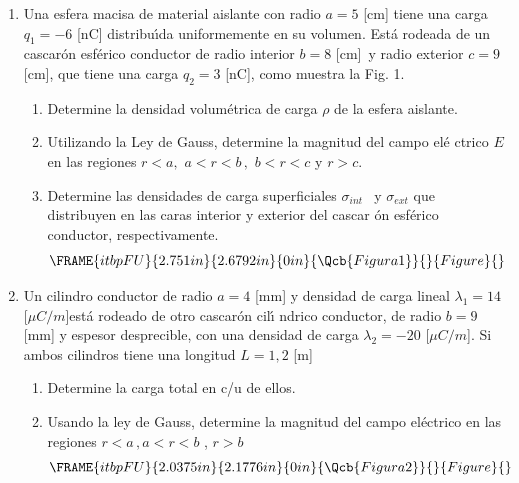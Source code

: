 \documentclass[onecolumn]{article}
\begin{document}
\begin{enumerate}
\item Una esfera macisa de material aislante con radio $a=5$ [cm] tiene una
carga  $q_{1}=-6$ [nC] distribu\'{\i}da uniformemente en su volumen. Est\'{a}
rodeada de un cascar\'{o}n esf\'{e}rico conductor de radio interior $b=8$
[cm]\thinspace\ y radio exterior $c=9$ [cm], que tiene una carga $q_{2}=3$
[nC], como muestra la Fig. 1.

\begin{enumerate}
\item Determine la densidad volum\'{e}trica de carga $\rho $ de la esfera
aislante.

\item Utilizando la Ley de Gauss, determine la magnitud del campo el\'{e}%
ctrico $E$ en las regiones $r<a,$ $a<r<b\,,$ $b<r<c$ y $r>c.$

\item Determine las densidades de carga superficiales $\sigma _{int\text{ }}$%
y $\sigma _{ext}$ que distribuyen en las caras interior y exterior del cascar%
\'{o}n esf\'{e}rico conductor, respectivamente.%
\begin{equation*}
\FRAME{itbpFU}{2.751in}{2.6792in}{0in}{\Qcb{Figura 1}}{}{Figure}{\special%
{language "Scientific Word";type "GRAPHIC";maintain-aspect-ratio
TRUE;display "USEDEF";valid_file "T";width 2.751in;height 2.6792in;depth
0in;original-width 8.3411in;original-height 8.1215in;cropleft "0";croptop
"1";cropright "1";cropbottom "0";tempfilename
'TLCXI900.bmp';tempfile-properties "XPR";}}
\end{equation*}%
\pagebreak 
\end{enumerate}

\item Un cilindro conductor de radio $a=4$ [mm] y densidad de carga lineal $%
\lambda _{1}=14$ [$\mu C/m$]est\'{a} rodeado de otro cascar\'{o}n cil\'{\i}%
ndrico conductor, de radio $b=9$ [mm] y espesor desprecible, con una
densidad de carga $\lambda _{2}=-20$ [$\mu C/m$]. Si ambos cilindros tiene
una longitud $L=1,2$ [m]

\begin{enumerate}
\item Determine la carga total en c/u de ellos.

\item Usando la ley de Gauss, determine la magnitud del campo el\'{e}ctrico
en las regiones $r<a\,,a<r<b$ , $r>b$%
\begin{equation*}
\FRAME{itbpFU}{2.0375in}{2.1776in}{0in}{\Qcb{Figura 2}}{}{Figure}{\special%
{language "Scientific Word";type "GRAPHIC";maintain-aspect-ratio
TRUE;display "USEDEF";valid_file "T";width 2.0375in;height 2.1776in;depth
0in;original-width 8.585in;original-height 9.1834in;cropleft "0";croptop
"1";cropright "1";cropbottom "0";tempfilename
'TLCZ2P01.bmp';tempfile-properties "XPR";}}
\end{equation*}
\end{enumerate}


\end{enumerate}
\end{document}
